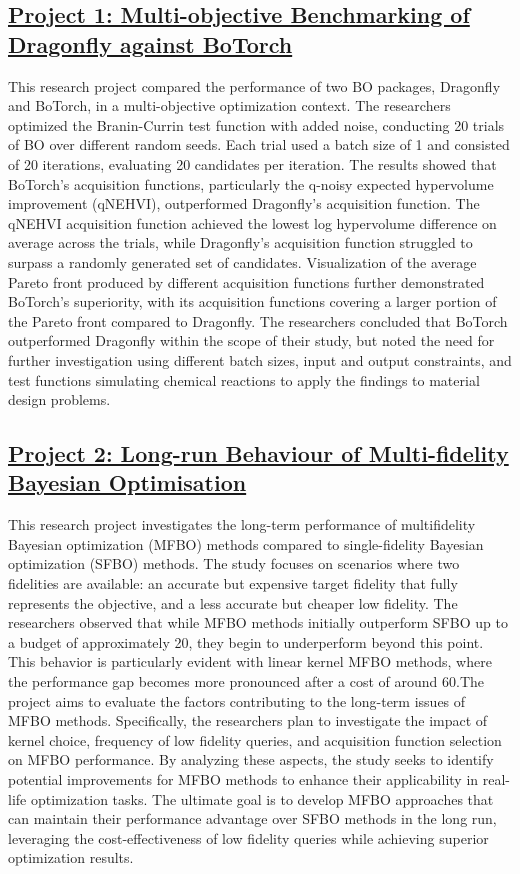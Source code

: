 \subsection*{\href{https://www.youtube.com/watch?v=Z7YiruHv3eE}{Project 1: Multi-objective Benchmarking of Dragonfly against BoTorch}}

This research project compared the performance of two BO packages, Dragonfly\cite{JMLRdragonfly} and BoTorch\cite{balandat2020botorch}, in a multi-objective optimization context. The researchers optimized the Branin-Currin test function with added noise, conducting 20 trials of BO over different random seeds. Each trial used a batch size of 1 and consisted of 20 iterations, evaluating 20 candidates per iteration. The results showed that BoTorch's acquisition functions, particularly the q-noisy expected hypervolume improvement (qNEHVI)\cite{daulton2021parallel}, outperformed Dragonfly's acquisition function. The qNEHVI acquisition function achieved the lowest log hypervolume difference on average across the trials, while Dragonfly's acquisition function struggled to surpass a randomly generated set of candidates. Visualization of the average Pareto front produced by different acquisition functions further demonstrated BoTorch's superiority, with its acquisition functions covering a larger portion of the Pareto front compared to Dragonfly. The researchers concluded that BoTorch outperformed Dragonfly within the scope of their study, but noted the need for further investigation using different batch sizes, input and output constraints, and test functions simulating chemical reactions to apply the findings to material design problems.
 \subsection*{\href{https://www.youtube.com/watch?v=pegJumJEOsE}{Project 2: Long-run Behaviour of Multi-fidelity Bayesian Optimisation}}

This research project investigates the long-term performance of multifidelity Bayesian optimization (MFBO) methods\cite{poloczek2017multi} compared to single-fidelity Bayesian optimization (SFBO) methods. The study focuses on scenarios where two fidelities are available: an accurate but expensive target fidelity that fully represents the objective, and a less accurate but cheaper low fidelity. The researchers observed that while MFBO methods initially outperform SFBO up to a budget of approximately 20, they begin to underperform beyond this point. This behavior is particularly evident with linear kernel MFBO methods, where the performance gap becomes more pronounced after a cost of around 60.The project aims to evaluate the factors contributing to the long-term issues of MFBO methods. Specifically, the researchers plan to investigate the impact of kernel choice, frequency of low fidelity queries, and acquisition function selection on MFBO performance. By analyzing these aspects, the study seeks to identify potential improvements for MFBO methods to enhance their applicability in real-life optimization tasks. The ultimate goal is to develop MFBO approaches that can maintain their performance advantage over SFBO methods in the long run, leveraging the cost-effectiveness of low fidelity queries while achieving superior optimization results.
